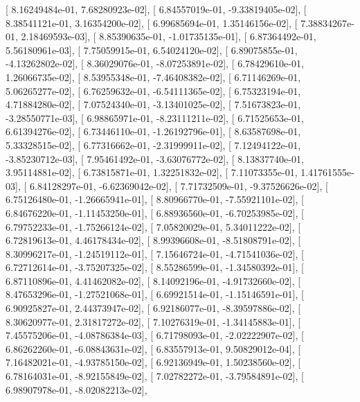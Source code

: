 \documentclass{article}
\begin{document}
       [  8.16249484e-01,   7.68280923e-02],
       [  6.84557019e-01,  -9.33819405e-02],
       [  8.38541121e-01,   3.16354200e-02],
       [  6.99685694e-01,   1.35146156e-02],
       [  7.38834267e-01,   2.18469593e-03],
       [  8.85390635e-01,  -1.01735135e-01],
       [  6.87364492e-01,   5.56180961e-03],
       [  7.75059915e-01,   6.54024120e-02],
       [  6.89075855e-01,  -4.13262802e-02],
       [  8.36029076e-01,  -8.07253891e-02],
       [  6.78429610e-01,   1.26066735e-02],
       [  8.53955348e-01,  -7.46408382e-02],
       [  6.71146269e-01,   5.06265277e-02],
       [  6.76259632e-01,  -6.54111365e-02],
       [  6.75323194e-01,   4.71884280e-02],
       [  7.07524340e-01,  -3.13401025e-02],
       [  7.51673823e-01,  -3.28550771e-03],
       [  6.98865971e-01,  -8.23111211e-02],
       [  6.71525653e-01,   6.61394276e-02],
       [  6.73446110e-01,  -1.26192796e-01],
       [  8.63587698e-01,   5.33328515e-02],
       [  6.77316662e-01,  -2.31999911e-02],
       [  7.12494122e-01,  -3.85230712e-03],
       [  7.95461492e-01,  -3.63076772e-02],
       [  8.13837740e-01,   3.95114881e-02],
       [  6.73815871e-01,   1.32251832e-02],
       [  7.11073355e-01,   1.41761555e-03],
       [  6.84128297e-01,  -6.62369042e-02],
       [  7.71732509e-01,  -9.37526626e-02],
       [  6.75126480e-01,  -1.26665941e-01],
       [  8.80966770e-01,  -7.55921101e-02],
       [  6.84676220e-01,  -1.11453250e-01],
       [  6.88936560e-01,  -6.70253985e-02],
       [  6.79752233e-01,  -1.75266124e-02],
       [  7.05820029e-01,   5.34011222e-02],
       [  6.72819613e-01,   4.46178434e-02],
       [  8.99396608e-01,  -8.51808791e-02],
       [  8.30996217e-01,  -1.24519112e-01],
       [  7.15646724e-01,  -4.71541036e-02],
       [  6.72712614e-01,  -3.75207325e-02],
       [  8.55286599e-01,  -1.34580392e-01],
       [  6.87110896e-01,   4.41462082e-02],
       [  8.14092196e-01,  -4.91732660e-02],
       [  8.47653296e-01,  -1.27521068e-01],
       [  6.69921514e-01,  -1.15146591e-01],
       [  6.90925827e-01,   2.44373947e-02],
       [  6.92186077e-01,  -8.39597886e-02],
       [  8.30620977e-01,   2.31817272e-02],
       [  7.10276319e-01,  -1.34145883e-01],
       [  7.45575206e-01,  -4.08786384e-03],
       [  6.71798093e-01,  -2.02222907e-02],
       [  6.86262260e-01,  -6.08843631e-02],
       [  6.83557913e-01,   9.50829012e-04],
       [  7.16482021e-01,  -4.93785150e-02],
       [  6.92136949e-01,   1.50238560e-02],
       [  6.78164031e-01,  -8.92155849e-02],
       [  7.02782272e-01,  -3.79584891e-02],
       [  6.98907978e-01,  -8.02082213e-02],
\end{document}
